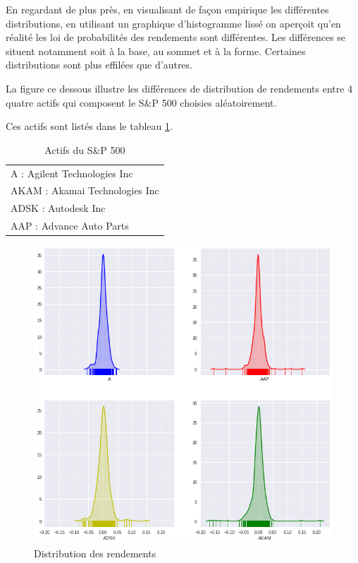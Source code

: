 En regardant de plus près, en visualisant de façon empirique les différentes distributions, en utilisant un graphique d’histogramme lissé on aperçoit qu'en réalité les loi de probabilités des rendements sont différentes. Les différences se situent notamment soit à la base, au sommet et à la forme. Certaines distributions sont plus effilées que d'autres. 

La figure ce dessous illustre les différences de distribution de rendements entre 4 quatre  actifs qui composent le S\&P 500 choisies aléatoirement.

Ces actifs sont listés dans le tableau \ref{actif}.

\begin{table}[H]
\centering
\caption{Actifs du S\&P 500}
\label{actif}
\begin{tabular}{|l|}
\hline
A : Agilent Technologies Inc \\
AKAM : Akamai Technologies Inc \\
ADSK : Autodesk Inc \\
AAP : Advance Auto Parts \\ \hline
\end{tabular}
\end{table}

\begin{figure}[H]
\centering
\caption{Distribution des rendements}
   \includegraphics[scale=0.7]{img/distrib2.png}
\end{figure}

